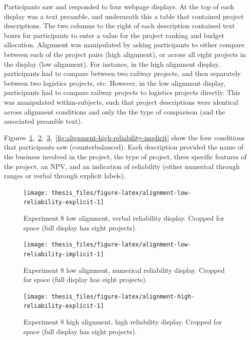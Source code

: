 \documentclass[a4paper, nobind, dvipsnames]{templates/ociamthesis}
\theoremstyle{definition}
\theoremstyle{definition}
\theoremstyle{definition}
\theoremstyle{definition}
\theoremstyle{remark}
\begin{document}
Participants saw and responded to four webpage displays. At the top of each
display was a text preamble, and underneath this a table that contained project
descriptions. The two columns to the right of each description contained text
boxes for participants to enter a value for the project ranking and budget
allocation. Alignment was manipulated by asking participants to either compare
between each of the project pairs (high alignment), or across all eight projects
in the display (low alignment). For instance, in the high alignment display,
participants had to compare between two railway projects, and then separately
between two logistics projects, etc. However, in the low alignment display,
participants had to compare railway projects to logistics projects directly.
This was manipulated within-subjects, such that project descriptions were
identical across alignment conditions and only the the type of comparison (and
the associated preamble text).

Figures~\ref{fig:alignment-low-reliability-explicit},~\ref{fig:alignment-low-reliability-implicit},~\ref{fig:alignment-high-reliability-explicit},~\ref{fig:alignment-high-reliability-implicit}
show the four conditions that participants saw (counterbalanced). Each
description provided the name of the business involved in the project, the type
of project, three specific features of the project, an NPV, and an indication of
reliability (either numerical through ranges or verbal through explicit labels).

\begin{figure}
\texttt{[image: thesis\_files/figure-latex/alignment-low-reliability-explicit-1]} \caption{Experiment 8 low alignment, verbal reliability display. Cropped for space (full display has eight projects).}\label{fig:alignment-low-reliability-explicit}
\end{figure}

\begin{figure}
\texttt{[image: thesis\_files/figure-latex/alignment-low-reliability-implicit-1]} \caption{Experiment 8 low alignment, numerical reliability display. Cropped for space (full display has eight projects).}\label{fig:alignment-low-reliability-implicit}
\end{figure}

\begin{figure}
\texttt{[image: thesis\_files/figure-latex/alignment-high-reliability-explicit-1]} \caption{Experiment 8 high alignment, high reliability display. Cropped for space (full display has eight projects).}\label{fig:alignment-high-reliability-explicit}
\end{figure}
\end{document}

